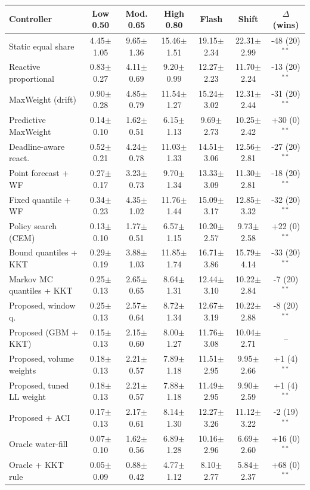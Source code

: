 \begin{tabular}{lcccccc}
\hline
Controller & Low 0.50 & Mod. 0.65 & High 0.80 & Flash & Shift & $\Delta$ (wins) \\
\hline
Static equal share & 4.45$\pm$1.05 & 9.65$\pm$1.36 & 15.46$\pm$1.51 & 19.15$\pm$2.34 & 22.31$\pm$2.99 & -48 (20)$^{\ast\ast}$ \\
Reactive proportional & 0.83$\pm$0.27 & 4.11$\pm$0.69 & 9.20$\pm$0.99 & 12.27$\pm$2.23 & 11.70$\pm$2.24 & -13 (20)$^{\ast\ast}$ \\
MaxWeight (drift) & 0.90$\pm$0.28 & 4.85$\pm$0.79 & 11.54$\pm$1.27 & 15.24$\pm$3.02 & 12.31$\pm$2.44 & -31 (20)$^{\ast\ast}$ \\
Predictive MaxWeight & 0.14$\pm$0.10 & 1.62$\pm$0.51 & 6.15$\pm$1.13 & 9.69$\pm$2.73 & 10.25$\pm$2.42 & +30 (0)$^{\ast\ast}$ \\
Deadline-aware react. & 0.52$\pm$0.21 & 4.24$\pm$0.78 & 11.03$\pm$1.33 & 14.51$\pm$3.06 & 12.56$\pm$2.81 & -27 (20)$^{\ast\ast}$ \\
Point forecast + WF & 0.27$\pm$0.17 & 3.23$\pm$0.73 & 9.70$\pm$1.34 & 13.33$\pm$3.09 & 11.30$\pm$2.81 & -18 (20)$^{\ast\ast}$ \\
Fixed quantile + WF & 0.34$\pm$0.23 & 4.35$\pm$1.02 & 11.76$\pm$1.44 & 15.09$\pm$3.17 & 12.85$\pm$3.32 & -32 (20)$^{\ast\ast}$ \\
Policy search (CEM) & 0.13$\pm$0.10 & 1.77$\pm$0.51 & 6.57$\pm$1.15 & 10.20$\pm$2.57 & 9.73$\pm$2.58 & +22 (0)$^{\ast\ast}$ \\
Bound quantiles + KKT & 0.29$\pm$0.19 & 3.88$\pm$1.03 & 11.85$\pm$1.74 & 16.71$\pm$3.86 & 15.79$\pm$4.14 & -33 (20)$^{\ast\ast}$ \\
Markov MC quantiles + KKT & 0.25$\pm$0.13 & 2.65$\pm$0.65 & 8.64$\pm$1.31 & 12.44$\pm$3.10 & 10.22$\pm$2.84 & -7 (20)$^{\ast\ast}$ \\
Proposed, window q. & 0.25$\pm$0.13 & 2.57$\pm$0.64 & 8.72$\pm$1.34 & 12.67$\pm$3.19 & 10.22$\pm$2.88 & -8 (20)$^{\ast\ast}$ \\
Proposed (GBM + KKT) & 0.15$\pm$0.13 & 2.15$\pm$0.60 & 8.00$\pm$1.27 & 11.76$\pm$3.08 & 10.04$\pm$2.71 & -- \\
Proposed, volume weights & 0.18$\pm$0.13 & 2.21$\pm$0.57 & 7.89$\pm$1.18 & 11.51$\pm$2.95 & 9.95$\pm$2.66 & +1 (4)$^{\ast\ast}$ \\
Proposed, tuned LL weight & 0.18$\pm$0.13 & 2.21$\pm$0.57 & 7.88$\pm$1.18 & 11.49$\pm$2.95 & 9.90$\pm$2.59 & +1 (4)$^{\ast\ast}$ \\
Proposed + ACI & 0.17$\pm$0.13 & 2.17$\pm$0.61 & 8.14$\pm$1.30 & 12.27$\pm$3.26 & 11.12$\pm$3.22 & -2 (19)$^{\ast\ast}$ \\
\hline
Oracle water-fill & 0.07$\pm$0.10 & 1.62$\pm$0.56 & 6.89$\pm$1.28 & 10.16$\pm$2.96 & 6.69$\pm$2.60 & +16 (0)$^{\ast\ast}$ \\
Oracle + KKT rule & 0.05$\pm$0.09 & 0.88$\pm$0.42 & 4.77$\pm$1.12 & 8.10$\pm$2.77 & 5.84$\pm$2.37 & +68 (0)$^{\ast\ast}$ \\
\hline
\end{tabular}
